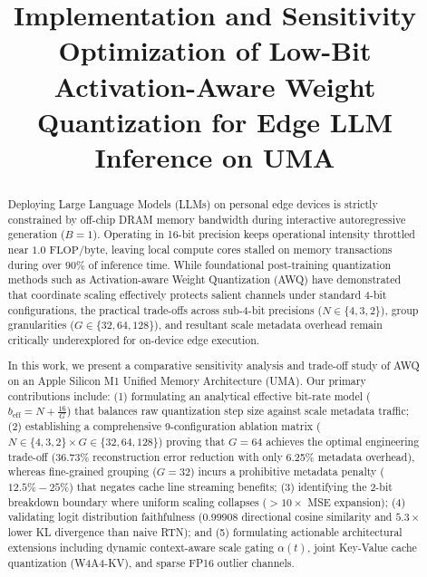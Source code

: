 \documentclass[conference]{IEEEtran}
\begin{document}
\title{Implementation and Sensitivity Optimization of Low-Bit Activation-Aware Weight Quantization for Edge LLM Inference on UMA}

\author{
}

\maketitle
\thispagestyle{plain}
\pagestyle{plain}

\begin{abstract}
Deploying Large Language Models (LLMs) on personal edge devices is strictly constrained by off-chip DRAM memory bandwidth during interactive autoregressive generation ($B=1$). Operating in 16-bit precision keeps operational intensity throttled near $1.0\text{ FLOP/byte}$, leaving local compute cores stalled on memory transactions during over $90\%$ of inference time. While foundational post-training quantization methods such as Activation-aware Weight Quantization (AWQ) have demonstrated that coordinate scaling effectively protects salient channels under standard 4-bit configurations, the practical trade-offs across sub-4-bit precisions ($N \in \{4, 3, 2\}$), group granularities ($G \in \{32, 64, 128\}$), and resultant scale metadata overhead remain critically underexplored for on-device edge execution.

In this work, we present a comparative sensitivity analysis and trade-off study of AWQ on an Apple Silicon M1 Unified Memory Architecture (UMA). Our primary contributions include: (1) formulating an analytical effective bit-rate model ($b_{\text{eff}} = N + \frac{16}{G}$) that balances raw quantization step size against scale metadata traffic; (2) establishing a comprehensive 9-configuration ablation matrix ($N \in \{4, 3, 2\} \times G \in \{32, 64, 128\}$) proving that $G=64$ achieves the optimal engineering trade-off (36.73\% reconstruction error reduction with only 6.25\% metadata overhead), whereas fine-grained grouping ($G=32$) incurs a prohibitive metadata penalty ($12.5\% - 25\%$) that negates cache line streaming benefits; (3) identifying the 2-bit breakdown boundary where uniform scaling collapses ($>10\times$ MSE expansion); (4) validating logit distribution faithfulness (0.99908 directional cosine similarity and $5.3\times$ lower KL divergence than naive RTN); and (5) formulating actionable architectural extensions including dynamic context-aware scale gating $\alpha(t)$, joint Key-Value cache quantization (W4A4-KV), and sparse FP16 outlier channels.
\end{abstract}
\end{document}
